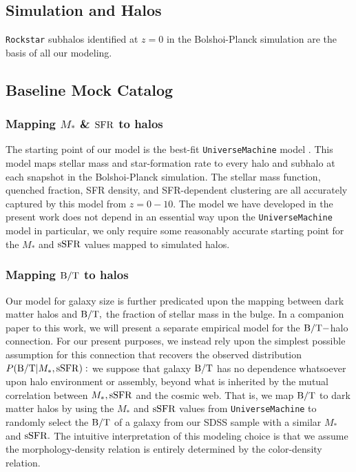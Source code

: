 \documentclass[usenatbib,usegraphicx,letterpaper]{mn2e}
\newcommand{\bt}{{\rm B/T}}
\newcommand{\mstar}{M_{\ast}}
\newcommand{\ssfr}{{\rm sSFR}}
\newcommand{\sfr}{{\rm SFR}}
\begin{document}
\subsection{Simulation and Halos}
\label{subsec:sim}

{\tt Rockstar} subhalos identified at $z=0$ in the Bolshoi-Planck simulation are the basis of all our modeling. 

\subsection{Baseline Mock Catalog}
\label{subsec:baselinemock}

\subsubsection{Mapping $\mstar$ \& $\sfr$ to halos}
\label{subsubsec:umachine}

The starting point of our model is the best-fit {\tt UniverseMachine} model \citep[][in prep]{behroozi_etal17}. This model maps stellar mass and star-formation rate to every halo and subhalo at each snapshot in the Bolshoi-Planck simulation. The stellar mass function, quenched fraction, SFR density, and SFR-dependent clustering are all accurately captured by this model from $z=0-10.$ The model we have developed in the present work does not depend in an essential way upon the {\tt UniverseMachine} model in particular, we only require some reasonably accurate starting point for the $\mstar$ and $\ssfr$ values mapped to simulated halos. 

\subsubsection{Mapping $\bt$ to halos}
\label{subsubsec:random_bt_model}

Our model for galaxy size is further predicated upon the mapping between dark matter halos and $\bt,$ the fraction of stellar mass in the bulge. In a companion paper to this work, we will present a separate empirical model for the $\bt-$halo connection. For our present purposes, we instead rely upon the simplest possible assumption for this connection that recovers the observed distribution $P(\bt\vert\mstar,\ssfr):$ we suppose that galaxy $\bt$ has no dependence whatsoever upon halo environment or assembly, beyond what is inherited by the mutual correlation between $\mstar, \ssfr$ and the cosmic web. That is, we map $\bt$ to dark matter halos by using the $\mstar$ and $\ssfr$ values from {\tt UniverseMachine} to randomly select the $\bt$ of a galaxy from our SDSS sample with a similar $\mstar$ and $\ssfr.$ The intuitive interpretation of this modeling choice is that we assume the morphology-density relation is entirely determined by the color-density relation. 
\end{document}
